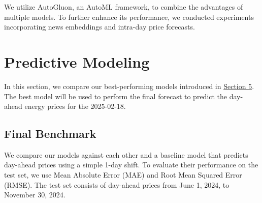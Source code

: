 \documentclass[a4paper]{article}
\begin{document}
We utilize AutoGluon, an AutoML framework, to combine the advantages of
multiple models. To further enhance its performance, we conducted
experiments incorporating news embeddings and intra-day price forecasts.

    \section{Predictive Modeling}\label{predictive-modeling}

    In this section, we compare our best-performing models introduced in
\hyperref[visualization-and-story-telling]{Section 5}. The best model
will be used to perform the final forecast to predict the day-ahead
energy prices for the 2025-02-18.

    \subsection{Final Benchmark}\label{final-benchmark}

    We compare our models against each other and a baseline model that
predicts day-ahead prices using a simple 1-day shift. To evaluate their
performance on the test set, we use Mean Absolute Error (MAE) and Root
Mean Squared Error (RMSE). The test set consists of day-ahead prices
from June 1, 2024, to November 30, 2024.
\end{document}
